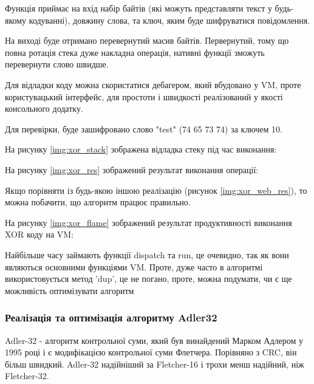 \documentclass{lib/styles/default-style}
\begin{document}
    Функція приймає на вхід набір байтів (які можуть представляти текст у будь-якому кодуванні), довжину слова, та ключ, яким буде
    шифруватися повідомлення.
    
    На виході буде отримано перевернутий масив байтів. Первернутий, тому що повна ротація стека дуже накладна операція, нативні функції
    зможуть перевернути слово швидше.

    Для відладки коду можна скористатися дебагером, який вбудовано у VM, проте користувацький інтерфейс, для простоти і швидкості
    реалізований у якості консольного додатку.

    Для перевірки, буде зашифровано слово "test" (74 65 73 74) за ключем 10.

    На рисунку \ref{img:xor_stack} зображена відладка стеку під час виконання:

    
    На рисунку \ref{img:xor_res} зображений результат виконання операції:

    
    Якщо порівняти із будь-якою іншою реалізацію (рисунок \ref{img:xor_web_res}), то можна побачити, що алгоритм працює правильно.


    На рисунку \ref{img:xor_flame} зображений результат продуктивності виконання XOR коду на VM:


    Найбільше часу займають функції dispatch та run, це очевидно, так як вони являються основними функціями VM.
    Проте, дуже часто в алгоритмі використовується метод 'dup', це не погано,
    проте, можна подумати, чи є ще можливість оптимізувати алгоритм

    \subsubsection{Реалізація та оптимізація алгоритму Adler32}
    
    Adler-32 - алгоритм контрольної суми, який був винайдений Марком Адлером у 1995 році і є модифікацією контрольної суми Флетчера.
    Порівняно з CRC, він більш швидкий. Adler-32 надійніший за Fletcher-16 і трохи менш надійний, ніж Fletcher-32.
\end{document}
